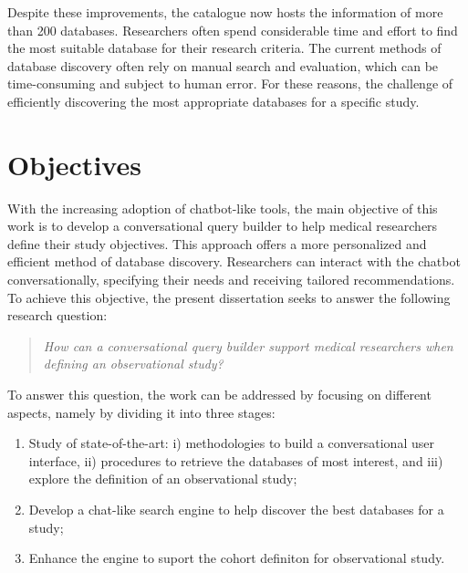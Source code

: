Despite these improvements, the catalogue now hosts the information of more than 200 databases. Researchers often spend considerable time and effort to find the most suitable database for their research criteria. The current methods of database discovery often rely on manual search and evaluation, which can be time-consuming and subject to human error. For these reasons, the challenge of efficiently discovering the most appropriate databases for a specific study. 



\section{Objectives}
\label{objectives}

With the increasing adoption of chatbot-like tools, the main objective of this work is to develop a conversational query builder to help medical researchers define their study objectives. This approach offers a more personalized and efficient method of database discovery. Researchers can interact with the chatbot conversationally, specifying their needs and receiving tailored recommendations. To achieve this objective, the present dissertation seeks to answer the following research question:

\begin{quote}
    \small\textit{How can a conversational query builder support medical researchers when defining an observational study?}
\end{quote}

To answer this question, the work can be addressed by focusing on different aspects, namely by dividing it into three stages:

\begin{enumerate}
    \item Study of state-of-the-art: i) methodologies to build a conversational user interface, ii) procedures to retrieve the databases of most interest, and iii) explore the definition of an observational study;
    \item Develop a chat-like search engine to help discover the best databases for a study;
    \item Enhance the engine to suport the cohort definiton for observational study. 
\end{enumerate}


